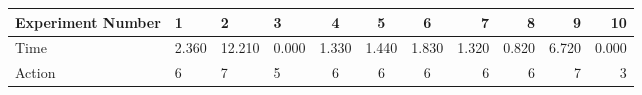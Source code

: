 \documentclass[8pt]{article}
\begin{document}
\begin{landscape}
\begin{tabular}{ | l | l | l | l | c | c | c | r | r | r | r | }
 \hline 
Experiment Number & 1 & 2 & 3 & 4 & 5 & 6 & 7 & 8 & 9 & 10\\ \hline
Time & 2.360 & 12.210 & 0.000 & 1.330 & 1.440 & 1.830 & 1.320 & 0.820 & 6.720 & 0.000\\ \hline
Action & 6 & 7 & 5 & 6 & 6 & 6 & 6 & 6 & 7 & 3\\ \hline\end{tabular}
\end{landscape}
\end{document}
